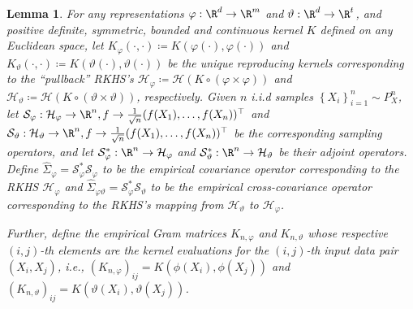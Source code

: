\documentclass{article} %
\newcommand{\Hil}{\mathcal{H}}
\newcommand{\rep}{\varphi}
\newcommand{\repone}{\phi}
\newcommand{\Hb}{\mathcal{H}_{\vartheta}}
\newcommand{\Hrep}{\mathcal{H}_{\varphi}}
\newcommand{\Srephat}{\hat{\Sigma}_{\rep}}
\newcommand{\Sabhat}{\hat{\Sigma}_{\varphi \vartheta}}
\newcommand{\Samprep}{\mathcal{S}_{\rep}}
\newcommand{\Sampb}{\mathcal{S}_{\vartheta}}
\newcommand{\Samprepad}{\Samprep^{*}}
\newcommand{\Sampbad}{\Sampb^{*}}
\newcommand{\Knrep}{K_{n,\rep}}
\newcommand{\Knb}{K_{n,\vartheta}}
\theoremstyle{plain}
\newcounter{lemmano}
\newtheorem{lemma}[lemmano]{Lemma}
\begin{document}
\begin{lemma}\label{Elementary properties of sampling, empirical covariance operator and kernel Gram matrix}
    For any representations $\rep : \R^d \to \R^m$ and $\vartheta: \R^d \to \R^t$, and positive definite, symmetric, bounded and continuous kernel $K$ defined on any Euclidean space, let $K_{\rep}(\cdot,\cdot) \coloneq K(\rep(\cdot),\rep(\cdot))$ and $K_{\vartheta}(\cdot,\cdot) \coloneq K(\vartheta(\cdot),\vartheta(\cdot))$ be the unique reproducing kernels corresponding to the ``pullback'' RKHS's $\Hrep \coloneq \Hil\left(K \circ \left(\rep \times \rep\right)\right)$ and $\mathcal{H}_{\vartheta} \coloneq \Hil\left(K \circ \left(\vartheta \times \vartheta\right)\right)$, respectively. Given $n$ i.i.d samples $\left\{X_i\right\}_{i=1}^n \sim P_X^n$, let $\Samprep: \Hrep \to \R^n, f \to \frac{1}{\sqrt{n}} (f(X_1), \dots, f(X_n))^{\top}$ and $\Sampb: \Hb \to \R^n, f \to \frac{1}{\sqrt{n}} (f(X_1), \dots, f(X_n))^{\top}$ be the corresponding sampling operators, and let $\Samprepad:\R^n \to \Hrep$ and $\Sampbad:\R^n \to \Hb$ be their adjoint operators. Define $\Srephat =\Samprepad\Samprep$ to be the empirical covariance operator corresponding to the RKHS $\Hrep$ and $\Sabhat = \Samprepad\Sampb$ to be the empirical cross-covariance operator corresponding to the RKHS's mapping from $\mathcal{H}_{\vartheta}$ to $\Hrep$. 

    Further, define the empirical Gram matrices $\Knrep$ and $\Knb$ whose respective $(i,j)$-th elements are the kernel evaluations for the $(i,j)$-th input data pair $(X_{i},X_{j})$, i.e., $\left(\Knrep\right)_{ij} = K(\repone(X_{i}),\repone(X_{j}))$ and $\left(\Knb\right)_{ij} = K(\vartheta(X_{i}),\vartheta(X_{j}))$.
    

\end{lemma}
\end{document}
